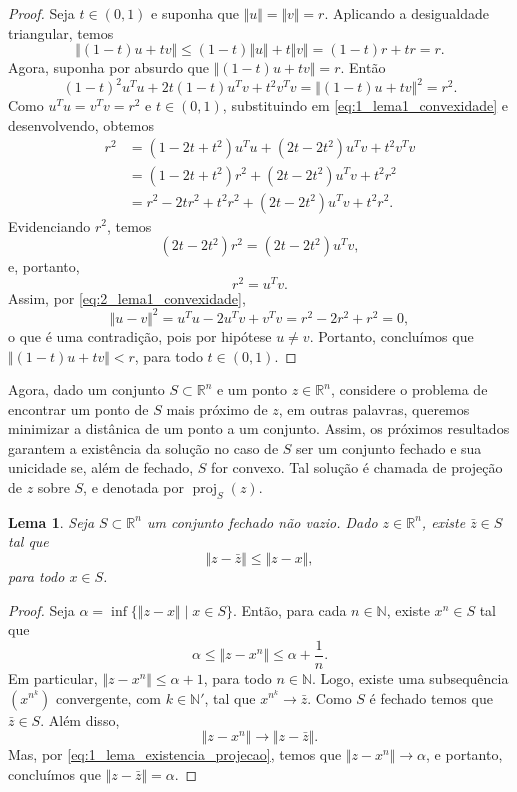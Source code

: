 \documentclass[12pt,a4paper]{scrartcl}
\DeclareMathOperator{\proj}{proj}
\def\RR{\mathds{R}}
\newtheorem{lema}{Lema}
\theoremstyle{definition}%
\begin{document}
\begin{proof}
Seja $t \in (0,1)$ e suponha que $\Vert u \Vert = \Vert v \Vert = r$. Aplicando a desigualdade triangular, temos
\[
\Vert (1-t)u + tv \Vert \leq (1-t)\Vert u \Vert + t\Vert v \Vert = (1-t)r + tr = r.
\]
Agora, suponha por absurdo que $\Vert (1-t)u + tv \Vert = r$. Então
\[ \label{eq:1_lema1_convexidade}
(1-t)^{2} u^{T}u + 2t(1-t)u^{T}v + t^{2}v^{T}v = \Vert (1-t)u + tv \Vert^{2} = r^{2}.
\]
Como $u^{T}u = v^{T}v = r^{2}$ e $t \in (0,1)$, substituindo em \eqref{eq:1_lema1_convexidade} e desenvolvendo, obtemos 
\begin{align}
r^{2} &= (1-2t+t^{2}) u^{T}u + (2t-2t^{2})u^{T}v + t^{2}v^{T}v \\
&= (1-2t+t^{2}) r^{2} + (2t-2t^{2})u^{T}v + t^{2}r^{2} \\
&= r^{2} - 2tr^{2} + t^{2}r^{2} + (2t-2t^{2})u^{T}v + t^{2}r^{2} .
\end{align}
Evidenciando $r^{2}$, temos
\[ 
(2t-2t^{2})r^{2} = (2t-2t^{2})u^{T}v,
\]
e, portanto,
\[ \label{eq:2_lema1_convexidade}
r^{2} = u^{T}v.
\]
Assim, por \eqref{eq:2_lema1_convexidade},
\[
\Vert u-v \Vert^{2} = u^{T}u - 2u^{T}v + v^{T}v = r^{2} - 2r^{2} + r^{2} = 0,
\]
o que é uma contradição, pois por hipótese $u \neq v$. 
Portanto, concluímos que $\Vert (1-t)u + tv \Vert < r$, para todo $t \in (0,1)$.
\end{proof}

Agora, dado um conjunto $S \subset \RR^{n}$ e um ponto $z \in \RR^{n}$, considere o problema de encontrar um ponto de $S$ mais próximo de $z$, em outras palavras, queremos minimizar a distânica de um ponto a um conjunto. Assim, os próximos resultados garantem a existência da solução no caso de $S$ ser um conjunto fechado e sua unicidade se, além de fechado, $S$ for convexo. Tal solução é chamada de projeção de $z$ sobre $S$, e denotada por $\proj_{S} (z)$. 

\begin{lema} \label{lema:existencia_projecao}
Seja $S \subset \RR^{n}$ um conjunto fechado não vazio. Dado $z \in \RR^{n}$, existe $\bar{z} \in S$ tal que
\[
\Vert z - \bar{z} \Vert \leq \Vert z - x \Vert,
\]
para todo $x \in S$.
\end{lema}
\begin{proof}
Seja $\alpha = \inf \{\Vert z-x \Vert \mid x \in S\}$. Então, para cada $n \in \mathds{N}$, existe $x^{n} \in S$ tal que
\[ \label{eq:1_lema_existencia_projecao}
\alpha \leq \Vert z-x^{n} \Vert \leq \alpha + \dfrac{1}{n}. 
\]
Em particular, $\Vert z-x^{n} \Vert \leq \alpha + 1$, para todo $n \in \mathds{N}$. Logo, existe uma subsequência $(x^{n^{k}})$ convergente, com $k \in \mathds{N}'$, tal que $x^{n^{k}} \longrightarrow \bar{z}$. Como $S$ é fechado temos que $\bar{z} \in S$. Além disso, 
\[
\Vert z-x^{n} \Vert \longrightarrow \Vert z-\bar{z} \Vert .
\]
Mas, por \eqref{eq:1_lema_existencia_projecao}, temos que $\Vert z-x^{n} \Vert \longrightarrow \alpha $, e portanto, concluímos que $\Vert z-\bar{z} \Vert = \alpha$.

\end{proof}
\end{document}
